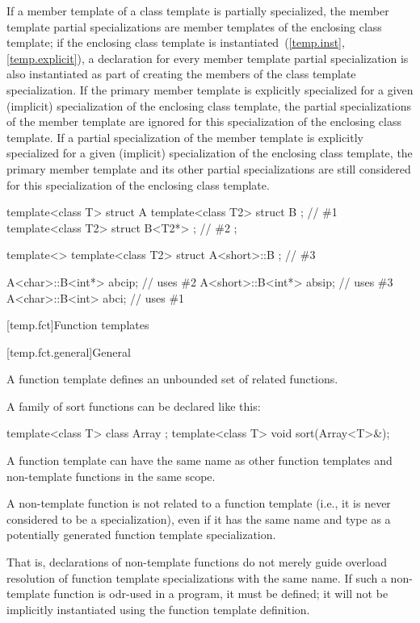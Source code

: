 \pnum
If a member template of a class template is partially specialized,
the member template partial specializations are member templates of
the enclosing class template;
if the enclosing class template is instantiated~(\ref{temp.inst}, \ref{temp.explicit}),
a declaration for every member template partial specialization is also
instantiated as part of creating the members of the class template
specialization.
If the primary member template is explicitly specialized for a given
(implicit) specialization of the enclosing class template,
the partial specializations of the member template are ignored for this
specialization of the enclosing class template.
If a partial specialization of the member template is explicitly specialized
for a given (implicit) specialization of the enclosing class template,
the primary member template and its other partial specializations are
still considered for this specialization of the enclosing class template.
\begin{example}
\begin{codeblock}
template<class T> struct A {
  template<class T2> struct B {};                               // \#1
  template<class T2> struct B<T2*> {};                          // \#2
};

template<> template<class T2> struct A<short>::B {};            // \#3

A<char>::B<int*>  abcip;                                        // uses \#2
A<short>::B<int*> absip;                                        // uses \#3
A<char>::B<int>  abci;                                          // uses \#1
\end{codeblock}
\end{example}

[temp.fct]{Function templates}

[temp.fct.general]{General}

\pnum
A function template defines an unbounded set of related functions.
\begin{example}
A family of sort functions can be declared like this:
\begin{codeblock}
template<class T> class Array { };
template<class T> void sort(Array<T>&);
\end{codeblock}
\end{example}

\pnum
\begin{note}
A function template can have the same name as other function templates
and non-template functions in the same scope.
\end{note}
A non-template function is not
related to a function template
(i.e., it is never considered to be a specialization),
even if it has the same name and type
as a potentially generated function template specialization.
\begin{footnote}
That is,
declarations of non-template functions do not merely guide
overload resolution of
function template specializations
with the same name.
If such a non-template function is odr-used in a program, it must be defined;
it will not be implicitly instantiated using the function template definition.
\end{footnote}

